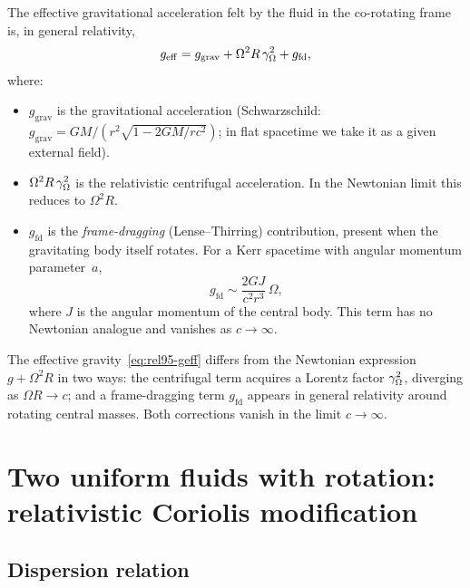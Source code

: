 The effective gravitational acceleration felt by the fluid in the
co-rotating frame is, in general relativity,
\begin{equation}
  g_{\mathrm{eff}}
    = g_{\mathrm{grav}}
      + \Omega^{2}R\,\gamma_{\Omega}^{2}
      + g_{\mathrm{fd}},
  \label{eq:rel95-geff}
\end{equation}
where:
\begin{itemize}
\item $g_{\mathrm{grav}}$ is the gravitational acceleration (Schwarzschild:
  $g_{\mathrm{grav}}=GM/(r^{2}\sqrt{1-2GM/rc^{2}})$; in flat spacetime
  we take it as a given external field).

\item $\Omega^{2}R\,\gamma_{\Omega}^{2}$ is the relativistic centrifugal
  acceleration.  In the Newtonian limit this reduces to $\Omega^{2}R$.

\item $g_{\mathrm{fd}}$ is the \emph{frame-dragging} (Lense--Thirring)
  contribution, present when the gravitating body itself rotates.  For
  a Kerr spacetime with angular momentum parameter~$a$,
  \begin{equation}
    g_{\mathrm{fd}} \sim \frac{2GJ}{c^{2}r^{3}}\,\Omega,
    \label{eq:rel95-framedrag}
  \end{equation}
  where $J$ is the angular momentum of the central body.  This term
  has no Newtonian analogue and vanishes as $c\to\infty$.
\end{itemize}

\begin{relcorrection}
The effective gravity~\eqref{eq:rel95-geff} differs from the
Newtonian expression $g + \Omega^{2}R$ in two ways: the centrifugal
term acquires a Lorentz factor $\gamma_{\Omega}^{2}$, diverging as
$\Omega R\to c$; and a frame-dragging term $g_{\mathrm{fd}}$ appears
in general relativity around rotating central masses.  Both
corrections vanish in the limit $c\to\infty$.
\end{relcorrection}

\section{Two uniform fluids with rotation: relativistic Coriolis
  modification}
\label{sec:rel-95-twofluids}

\subsection{Dispersion relation}

